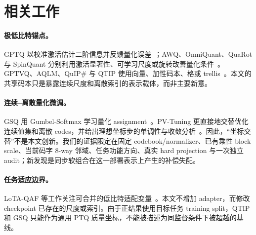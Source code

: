 \section{相关工作}
\paragraph{极低比特锚点。}
GPTQ 以校准激活估计二阶信息并反馈量化误差~\cite{gptq}；AWQ、OmniQuant、QuaRot 与 SpinQuant 分别利用激活显著性、可学习尺度或旋转改善量化条件~\cite{awq,omniquant,quarot,spinquant}。GPTVQ、AQLM、QuIP\# 与 QTIP 使用向量、加性码本、格或 trellis~\cite{gptvq,aqlm,quipsharp,qtip}。本文的共享码本只是暴露连续尺度和离散索引的表示载体，而非主要新意。

\paragraph{连续--离散量化微调。}
GSQ 用 Gumbel-Softmax 学习量化 assignment~\cite{gsq,gumbel,concrete}。PV-Tuning 更直接地交替优化连续值集和离散 codes，并给出理想坐标步的单调性与收敛分析~\cite{pvtuning}。因此，“坐标交替”不是本文创新。我们的证据限定在固定 codebook/normalizer、已有乘性 block scale、当前码字 8-way 邻域、任务功能方向、真实 hard projection 与一次独立 audit；新发现是同步软组合在这一部署表示上产生的补偿失配。

\paragraph{任务适应边界。}
LoTA-QAF 等工作关注可合并的低比特适配变量~\cite{lotaqaf}。本文不增加 adapter，而修改 checkpoint 已存在的尺度或索引。由于正结果使用目标任务 training split，QTIP 和 GSQ 只能作为通用 PTQ 质量坐标，不能被描述为同监督条件下被超越的基线。
